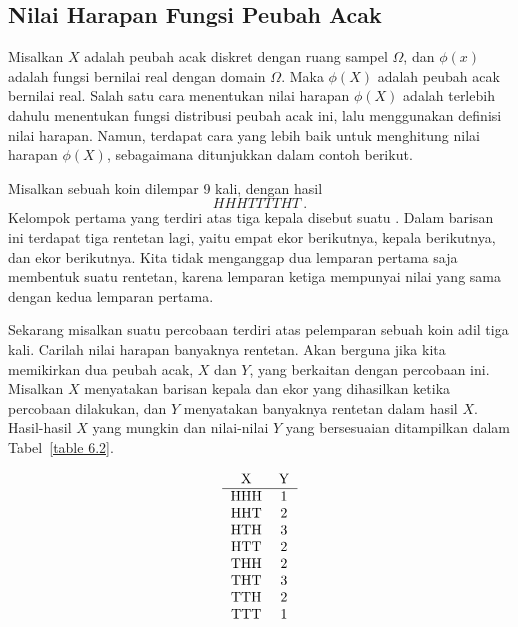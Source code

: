 \subsection*{Nilai Harapan Fungsi Peubah Acak}

Misalkan $X$ adalah peubah acak diskret dengan ruang sampel $\Omega$, dan $\phi(x)$
adalah fungsi bernilai real dengan domain $\Omega$. Maka $\phi(X)$ adalah peubah acak
bernilai real. Salah satu cara menentukan nilai harapan $\phi(X)$ adalah terlebih
dahulu menentukan fungsi distribusi peubah acak ini, lalu menggunakan definisi nilai
harapan. Namun, terdapat cara yang lebih baik untuk menghitung nilai harapan
$\phi(X)$, sebagaimana ditunjukkan dalam contoh berikut.

\begin{example}\label{exam 6.1.5} Misalkan sebuah koin dilempar 9 kali, dengan hasil
\[ HHHTTTTHT\ . \]    
\noindent Kelompok pertama yang terdiri atas tiga kepala disebut suatu
. Dalam barisan ini terdapat tiga rentetan lagi, yaitu
empat ekor berikutnya, kepala berikutnya, dan ekor berikutnya. Kita tidak menganggap
dua lemparan pertama saja membentuk suatu rentetan, karena lemparan ketiga mempunyai
nilai yang sama dengan kedua lemparan pertama.
\par Sekarang misalkan suatu percobaan terdiri atas pelemparan sebuah koin adil tiga
kali. Carilah nilai harapan banyaknya rentetan. Akan berguna jika kita memikirkan dua
peubah acak, $X$ dan $Y$, yang berkaitan dengan percobaan ini. Misalkan $X$ menyatakan
barisan kepala dan ekor yang dihasilkan ketika percobaan dilakukan, dan $Y$ menyatakan
banyaknya rentetan dalam hasil $X$. Hasil-hasil $X$ yang mungkin dan nilai-nilai $Y$
yang bersesuaian ditampilkan dalam Tabel~\ref{table 6.2}.
\begin{table}
\centering
$$\begin{tabular}{cc} X    &  Y \\ \hline HHH  & 1\\ HHT  & 2\\ HTH  & 3\\ HTT  & 2\\
THH  & 2\\ THT  & 3\\ TTH  & 2\\ TTT  & 1\\
\end{tabular}
$$
\caption{Melempar sebuah koin tiga kali.}
\label{table 6.2}
\end{table}


\end{example}
